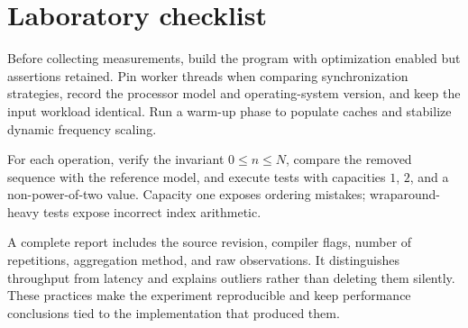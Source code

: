 \documentclass[english]{../../unipd-notes}
\begin{document}
\printcourselists

\courseappendices
\chapter{Laboratory checklist}

Before collecting measurements, build the program with optimization enabled but assertions retained. Pin worker threads when comparing synchronization strategies, record the processor model and operating-system version, and keep the input workload identical. Run a warm-up phase to populate caches and stabilize dynamic frequency scaling.

For each operation, verify the invariant $0\leq n\leq N$, compare the removed sequence with the reference model, and execute tests with capacities $1$, $2$, and a non-power-of-two value. Capacity one exposes ordering mistakes; wraparound-heavy tests expose incorrect index arithmetic.

A complete report includes the source revision, compiler flags, number of repetitions, aggregation method, and raw observations. It distinguishes throughput from latency and explains outliers rather than deleting them silently. These practices make the experiment reproducible and keep performance conclusions tied to the implementation that produced them.
\end{document}
